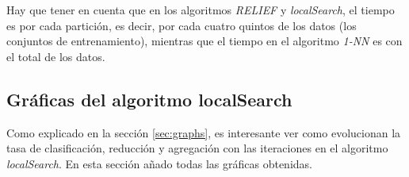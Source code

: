 \documentclass[11pt,a4paper]{article}
\begin{document}
Hay que tener en cuenta que en los algoritmos \emph{RELIEF} y \emph{localSearch}, el tiempo es por cada partición, es decir, por cada cuatro quintos de los datos (los conjuntos de entrenamiento), mientras que el tiempo en el algoritmo \emph{1-NN} es con el total de los datos.

\subsection{Gráficas del algoritmo localSearch}

Como explicado en la sección \ref{sec:graphs}, es interesante ver como evolucionan la tasa de clasificación, reducción y agregación con las iteraciones en el algoritmo \emph{localSearch}. En esta sección añado todas las gráficas obtenidas.

\begin{figure}[H]
	\centering

\end{figure}
\end{document}
